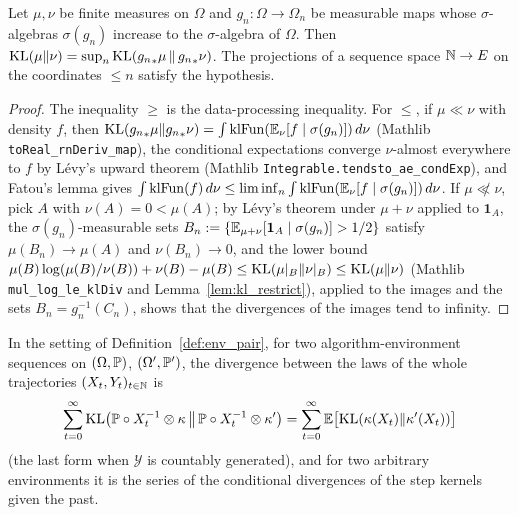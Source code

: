 \begin{lemma}\label{lem:kl_iSup_map}
\leanok
{}
Let $\mu,\nu$ be finite measures on $\Omega$ and $g_n : \Omega\to\Omega_n$ be measurable maps whose
$\sigma$-algebras $\sigma(g_n)$ increase to the $\sigma$-algebra of $\Omega$. Then
$\mathrm{KL}(\mu\|\nu) = \sup_n \mathrm{KL}({g_n}_*\mu\,\|\,{g_n}_*\nu)$. The projections of a sequence space
$\mathbb{N}\to E$ on the coordinates $\le n$ satisfy the hypothesis.
\end{lemma}

\begin{proof}
\leanok
{}
The inequality $\ge$ is the data-processing inequality. For $\le$, if $\mu\ll\nu$ with density
$f$, then $\mathrm{KL}({g_n}_*\mu\|{g_n}_*\nu) = \int\mathrm{klFun}(\mathbb{E}_\nu[f\mid\sigma(g_n)])\,d\nu$ (Mathlib
\texttt{toReal\_rnDeriv\_map}), the conditional expectations converge $\nu$-almost everywhere to
$f$ by L\'evy's upward theorem (Mathlib \texttt{Integrable.tendsto\_ae\_condExp}), and Fatou's
lemma gives $\int\mathrm{klFun}(f)\,d\nu \le \liminf_n\int\mathrm{klFun}(\mathbb{E}_\nu[f\mid\sigma(g_n)])\,d\nu$.
If $\mu\not\ll\nu$, pick $A$ with $\nu(A) = 0 < \mu(A)$; by L\'evy's theorem under $\mu+\nu$
applied to $\mathbf 1_A$, the $\sigma(g_n)$-measurable sets $B_n := \{\mathbb{E}_{\mu+\nu}[\mathbf 1_A\mid\sigma(g_n)] > 1/2\}$
satisfy $\mu(B_n)\to\mu(A)$ and $\nu(B_n)\to 0$, and the lower bound
$\mu(B)\log(\mu(B)/\nu(B)) + \nu(B) - \mu(B) \le \mathrm{KL}(\mu|_B\|\nu|_B) \le \mathrm{KL}(\mu\|\nu)$ (Mathlib
\texttt{mul\_log\_le\_klDiv} and Lemma~\ref{lem:kl_restrict}), applied to the images and the
sets $B_n = g_n^{-1}(C_n)$, shows that the divergences of the images tend to infinity.
\end{proof}

\begin{theorem}\label{thm:divergence_decomposition_trajectory}
\leanok
{}
In the setting of Definition~\ref{def:env_pair}, for two algorithm-environment sequences on
$(\Omega,\mathbb{P})$, $(\Omega',\mathbb{P}')$, the divergence between the laws of the whole trajectories
$(X_t,Y_t)_{t\in\mathbb{N}}$ is
\[
  \sum_{t=0}^{\infty}\mathrm{KL}\big(\mathbb{P}\circ X_t^{-1}\otimes\kappa\,\big\|\,\mathbb{P}\circ X_t^{-1}\otimes\kappa'\big)
  = \sum_{t=0}^{\infty}\mathbb{E}\big[\mathrm{KL}(\kappa(X_t)\|\kappa'(X_t))\big]
\]
(the last form when $\mathcal{Y}$ is countably generated), and for two arbitrary environments it
is the series of the conditional divergences of the step kernels given the past.
\end{theorem}

